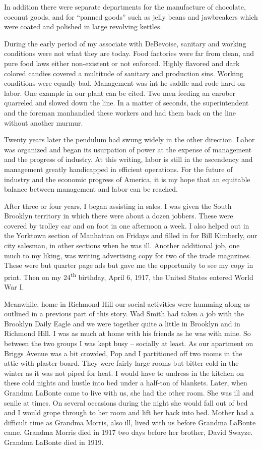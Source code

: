 \documentclass[12pt]{book}              %
\begin{document}
In addition there were separate departments for the manufacture of chocolate, coconut goods, and for ``panned goods'' such as jelly beans and jawbreakers which were coated and polished in large revolving kettles. 

During the early period of my associate with DeBevoise, sanitary and working conditions were not what they are today. Food factories were far from clean, and pure food laws either non-existent or not enforced. Highly flavored and dark colored candies covered a multitude of sanitary and production sins. Working conditions were equally bad. Management was int he saddle and rode hard on labor. One example in our plant can be cited. Two men feeding an enrober quarreled and slowed down the line. In a matter of seconds, the superintendent and the foreman manhandled these workers and had them back on the line without another murmur.

Twenty years later the pendulum had swung widely in the other direction. Labor was organized and began its usurpation of power at the expense of management and the progress of industry. At this writing, labor is still in the ascendency and management greatly handicapped in efficient operations. For the future of industry and the economic progress of America, it is my hope that an equitable balance between management and labor can be reached. 

After three or four years, I began assisting in sales. I was given the South Brooklyn territory in which there were about a dozen jobbers. These were covered by trolley car and on foot in one afternoon a week. I also helped out in the Yorktown section of Manhattan on Fridays and filled in for Bill Kimberly, our city salesman, in other sections when he was ill. Another additional job, one much to my liking, was writing advertising copy for two of the trade magazines. These were but quarter page ads but gave me the opportunity to see my copy in print. Then on my 24\textsuperscript{th} birthday, April 6, 1917, the United States entered World War I.


Meanwhile, home in Richmond Hill our social activities were humming along as outlined in a previous part of this story. Wad Smith had taken a job with the Brooklyn Daily Eagle and we were together quite a little in Brooklyn and in Richmond Hill. I was as much at home with his friends as he was with mine. So between the two groups I was kept busy -- socially at least. As our apartment on Briggs Avenue was a bit crowded, Pop and I partitioned off two rooms in the attic with plaster board. They were fairly large rooms but bitter cold in the winter as it was not piped for heat. I would have to undress in the kitchen on these cold nights and hustle into bed under a half-ton of blankets. Later, when Grandma LaBonte came to live with us, she had the other room. She was ill and senile at times. On several occasions during the night she would fall out of bed and I would grope through to her room and lift her back into bed. Mother had a difficult time as Grandma Morris, also ill, lived with us before Grandma LaBonte came. Grandma Morris died in 1917 two days before her brother, David Swayze. Grandma LaBonte died in 1919. 
\end{document}
